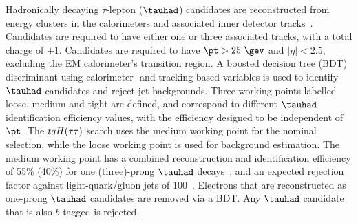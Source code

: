 Hadronically decaying $\tau$-lepton ($\tauhad$) candidates are reconstructed from energy clusters in the calorimeters and
associated inner detector tracks~\cite{ATL-PHYS-PUB-2015-045}. Candidates are required to have either one or three associated tracks,
with a total charge of $\pm 1$. Candidates are required to have $\pt > 25~\gev$ and $|\eta|<2.5$, excluding the EM calorimeter's transition region.
A boosted decision tree (BDT) discriminant using calorimeter- and tracking-based variables is used to identify $\tauhad$ candidates and reject
jet backgrounds. Three working points labelled loose, medium and tight are defined, and correspond to different $\tauhad$ identification efficiency 
values, with the efficiency designed to be independent of $\pt$. The $tqH(\tau\tau)$ search uses the medium
working point for the nominal selection, while the loose working point is used for background estimation.
The medium working point has a combined reconstruction and identification efficiency of 55\% (40\%) for one (three)-prong $\tauhad$ 
decays~\cite{ATLAS-CONF-2017-029}, and an expected rejection factor against light-quark/gluon jets of 100~\cite{ATL-PHYS-PUB-2015-045}. 
Electrons that are reconstructed as one-prong $\tauhad$ candidates are removed via a BDT.
Any $\tauhad$ candidate that is also $b$-tagged is rejected.

